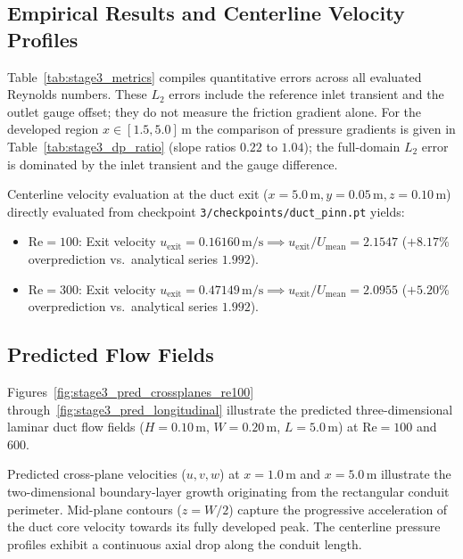 \documentclass[11pt,a4paper]{article}
\begin{document}
\subsection{Empirical Results and Centerline Velocity Profiles}
Table~\ref{tab:stage3_metrics} compiles quantitative errors across all evaluated Reynolds numbers. These $L_2$ errors include the reference inlet transient and the outlet gauge offset; they do not measure the friction gradient alone. For the developed region $x \in [1.5, 5.0]\,\text{m}$ the comparison of pressure gradients is given in Table~\ref{tab:stage3_dp_ratio} (slope ratios $0.22$ to $1.04$); the full-domain $L_2$ error is dominated by the inlet transient and the gauge difference.


Centerline velocity evaluation at the duct exit ($x=5.0\,\text{m}, y=0.05\,\text{m}, z=0.10\,\text{m}$) directly evaluated from checkpoint \texttt{3/checkpoints/duct\_pinn.pt} yields:
\begin{itemize}[leftmargin=1.5em]
    \item $\mathrm{Re}=100$: Exit velocity $u_{\mathrm{exit}} = 0.16160\,\text{m/s} \implies u_{\mathrm{exit}}/U_{\mathrm{mean}} = \mathbf{2.1547}$ ($+8.17\%$ overprediction vs.\ analytical series $1.992$).
    \item $\mathrm{Re}=300$: Exit velocity $u_{\mathrm{exit}} = 0.47149\,\text{m/s} \implies u_{\mathrm{exit}}/U_{\mathrm{mean}} = \mathbf{2.0955}$ ($+5.20\%$ overprediction vs.\ analytical series $1.992$).
\end{itemize}


\subsection{Predicted Flow Fields}
Figures~\ref{fig:stage3_pred_crossplanes_re100} through~\ref{fig:stage3_pred_longitudinal} illustrate the predicted three-dimensional laminar duct flow fields ($H=0.10\,\text{m}$, $W=0.20\,\text{m}$, $L=5.0\,\text{m}$) at $\mathrm{Re} = 100$ and $600$.

Predicted cross-plane velocities ($u, v, w$) at $x = 1.0\,\text{m}$ and $x = 5.0\,\text{m}$ illustrate the two-dimensional boundary-layer growth originating from the rectangular conduit perimeter. Mid-plane contours ($z = W/2$) capture the progressive acceleration of the duct core velocity towards its fully developed peak. The centerline pressure profiles exhibit a continuous axial drop along the conduit length.
\end{document}
